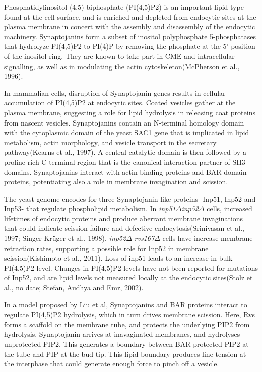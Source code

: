 \vspace{5mm}
Phosphatidylinositol (4,5)-biphosphate (PI(4,5)P2) is an important lipid type found at the cell surface, and is enriched and depleted from endocytic sites at the plasma membrane in concert with the assembly and disassembly of the endocytic machinery. Synaptojanins form a subset of inositol polyphosphate 5-phosphatases that hydrolyze PI(4,5)P2 to PI(4)P by removing the phosphate at the 5’ position of the inositol ring. They are known to take part in CME and intracellular signalling, as well as in modulating the actin cytoskeleton(McPherson et al., 1996). 


\vspace{5mm}
In mammalian cells, disruption of Synaptojanin genes results in cellular accumulation of PI(4,5)P2 at endocytic sites. Coated vesicles gather at the plasma membrane, suggesting a role for lipid hydrolysis in releasing coat proteins from nascent vesicles. Synaptojanins contain an N-terminal homology domain with the cytoplasmic domain of the yeast SAC1 gene that is implicated in lipid metabolism, actin morphology, and vesicle transport in the secretary pathway(Kearns et al., 1997). A central catalytic domain is then followed by a proline-rich C-terminal region that is the canonical interaction partner of SH3 domains. Synaptojanins interact with actin binding proteins and BAR domain proteins, potentiating also a role in membrane invagination and scission. 


\vspace{5mm}
The yeast genome encodes for three Synaptojanin-like proteins- Inp51, Inp52 and Inp53- that regulate phospholipid metabolism. In \textit{inp51$\Delta$}\textit{inp52$\Delta$}
 cells, increased lifetimes of endocytic proteins and produce aberrant membrane invaginations that could indicate scission failure and defective endocytosis(Srinivasan et al., 1997; Singer-Krüger et al., 1998). \textit{inp52$\Delta$} \textit{rvs167$\Delta$}
 cells have increase membrane retraction rates, supporting a possible role for Inp52 in membrane scission(Kishimoto et al., 2011). Loss of inp51 leads to an increase in bulk PI(4,5)P2 level. Changes in PI(4,5)P2 levels have not been reported for mutations of Inp52, and are lipid levels not measured locally at the endocytic sites(Stolz et al., no date; Stefan, Audhya and Emr, 2002).


\vspace{5mm}
In a model proposed by Liu et al, Synaptojanins and BAR proteins interact to regulate PI(4,5)P2 hydrolysis, which in turn drives membrane scission. Here, Rvs forms a scaffold on the membrane tube, and protects the underlying PIP2 from hydrolysis. Synaptojanin arrives at inavaginated membranes, and hydrolyses unprotected PIP2. This generates a boundary between BAR-protected PIP2 at the tube and PIP at the bud tip. This lipid boundary produces line tension at the interphase that could generate enough force to pinch off a vesicle. 


